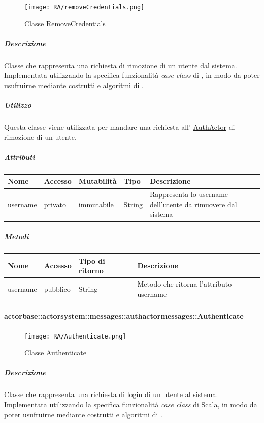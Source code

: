 \documentclass{scalatekids-article}
\begin{document}
\begin{figure}[H]
  \begin{center}
    \texttt{[image: RA/removeCredentials.png]}
    \caption{Classe RemoveCredentials}
  \end{center}
\end{figure}

\subparagraph{Descrizione}
Classe che rappresenta una richiesta di rimozione di un utente dal
sistema.\\Implementata utilizzando la specifica funzionalità \textit{case class}
di , in modo da poter usufruirne mediante costrutti e algoritmi di
.

\subparagraph{Utilizzo}
Questa classe viene utilizzata per mandare una richiesta all'
\hyperref[sec:actorbase::actorsystem::actors::authactor::AuthActor]{AuthActor}
di rimozione di un utente.

\subparagraph{Attributi}
\begin{tabular}{| p{2cm} | p{1.5cm} | p{2cm} | p{3cm} | p{8.5cm} |}
  \hline
  Nome & Accesso & Mutabilità & Tipo & Descrizione\\
  \hline
  username & privato & immutabile & String & Rappresenta lo username dell'utente da rimuovere dal sistema\\
  \hline
\end{tabular}

\subparagraph{Metodi}
\begin{tabular}{| l | l | l | l |}
  \hline
  Nome & Accesso & Tipo di ritorno & Descrizione\\
  \hline
  username & pubblico & String & Metodo che ritorna l'attributo username\\
  \hline
\end{tabular}

\paragraph{actorbase::actorsystem::messages::authactormessages::Authenticate}
\label{sec:actorbase::actorsystem::messages::authactormessages::Authenticate}

\begin{figure}[H]
  \begin{center}
    \texttt{[image: RA/Authenticate.png]}
    \caption{Classe Authenticate}
  \end{center}
\end{figure}

\subparagraph{Descrizione}
Classe che rappresenta una richiesta di login di un utente al sistema.\\Implementata utilizzando la specifica funzionalità \textit{case class} di Scala,
in modo da poter usufruirne mediante costrutti e algoritmi di
.
\end{document}
